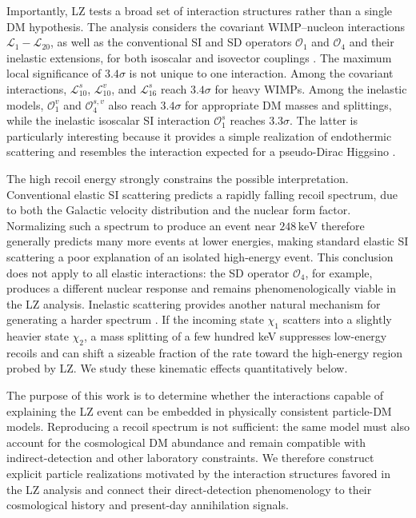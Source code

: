 \documentclass[aps,prd,reprint,superscriptaddress,nofootinbib,longbibliography,floatfix]{revtex4-2}
\newcommand{\keV}{\mathrm{keV}}
\begin{document}
Importantly, LZ tests a broad set of interaction structures rather than a single DM hypothesis. The analysis considers the covariant WIMP--nucleon interactions $\mathcal{L}_1-\mathcal{L}_{20}$, as well as the conventional SI and SD operators $\mathcal{O}_1$ and $\mathcal{O}_4$ and their inelastic extensions, for both isoscalar and isovector couplings \cite{Fan2010,Fitzpatrick2013,Anand2014,LZ2026Extended}. The maximum local significance of $3.4\sigma$ is not unique to one interaction. Among the covariant interactions, $\mathcal{L}_{10}^{s}$, $\mathcal{L}_{10}^{v}$, and $\mathcal{L}_{16}^{s}$ reach $3.4\sigma$ for heavy WIMPs. Among the inelastic models, $\mathcal{O}_1^{v}$ and $\mathcal{O}_4^{s,v}$ also reach $3.4\sigma$ for appropriate DM masses and splittings, while the inelastic isoscalar SI interaction $\mathcal{O}_1^{s}$ reaches $3.3\sigma$. The latter is particularly interesting because it provides a simple realization of endothermic scattering and resembles the interaction expected for a pseudo-Dirac Higgsino \cite{Graham2025}.

The high recoil energy strongly constrains the possible interpretation. Conventional elastic SI scattering predicts a rapidly falling recoil spectrum, due to both the Galactic velocity distribution and the nuclear form factor. Normalizing such a spectrum to produce an event near $248\,\keV$ therefore generally predicts many more events at lower energies, making standard elastic SI scattering a poor explanation of an isolated high-energy event. This conclusion does not apply to all elastic interactions: the SD operator $\mathcal{O}_4$, for example, produces a different nuclear response and remains phenomenologically viable in the LZ analysis. Inelastic scattering provides another natural mechanism for generating a harder spectrum \cite{TuckerSmith2001,TuckerSmith2005,Barello2014,Bramante2016}. If the incoming state $\chi_1$ scatters into a slightly heavier state $\chi_2$, a mass splitting of a few hundred keV suppresses low-energy recoils and can shift a sizeable fraction of the rate toward the high-energy region probed by LZ. We study these kinematic effects quantitatively below.

The purpose of this work is to determine whether the interactions capable of explaining the LZ event can be embedded in physically consistent particle-DM models. Reproducing a recoil spectrum is not sufficient: the same model must also account for the cosmological DM abundance and remain compatible with indirect-detection and other laboratory constraints. We therefore construct explicit particle realizations motivated by the interaction structures favored in the LZ analysis and connect their direct-detection phenomenology to their cosmological history and present-day annihilation signals.
\end{document}
